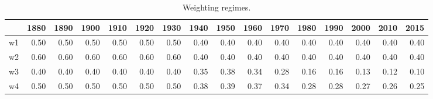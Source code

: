 \documentclass[11pt]{article}\usepackage[]{graphicx}\usepackage[]{color}
\begin{document}
\begin{table}[ht]
\centering
\begingroup\footnotesize
\begin{tabular}{rrrrrrrrrrrrrrrr}
  \hline
 & 1880 & 1890 & 1900 & 1910 & 1920 & 1930 & 1940 & 1950 & 1960 & 1970 & 1980 & 1990 & 2000 & 2010 & 2015 \\ 
  \hline
w1 & 0.50 & 0.50 & 0.50 & 0.50 & 0.50 & 0.50 & 0.40 & 0.40 & 0.40 & 0.40 & 0.40 & 0.40 & 0.40 & 0.40 & 0.40 \\ 
  w2 & 0.60 & 0.60 & 0.60 & 0.60 & 0.60 & 0.60 & 0.40 & 0.40 & 0.40 & 0.40 & 0.40 & 0.40 & 0.40 & 0.40 & 0.40 \\ 
  w3 & 0.40 & 0.40 & 0.40 & 0.40 & 0.40 & 0.40 & 0.35 & 0.38 & 0.34 & 0.28 & 0.16 & 0.16 & 0.13 & 0.12 & 0.10 \\ 
  w4 & 0.50 & 0.50 & 0.50 & 0.50 & 0.50 & 0.50 & 0.38 & 0.39 & 0.37 & 0.34 & 0.28 & 0.28 & 0.27 & 0.26 & 0.25 \\ 
   \hline
\end{tabular}
\endgroup
\caption{Weighting regimes.} 
\end{table}
\end{document}

